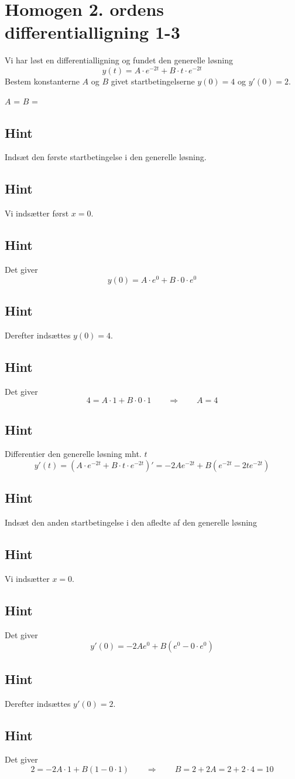 \documentclass{article}
\newenvironment{exercise}[1]{\newpage\section{#1}}{}
\newcommand{\answerbox}[1]{\fbox{$#1$}}
\newcommand{\hint}{\subsection*{Hint}}
\begin{document}
\begin{exercise}{Homogen 2. ordens differentialligning 1-3}
	
Vi har løst en differentialligning og fundet den generelle løsning
\[
y(t) = A \cdot e^{-2t} + B \cdot t \cdot e^{-2t}
\]
Bestem konstanterne $A$ og $B$ givet startbetingelserne $y(0)=4$ og $y'(0)=2$.


$A$ = \answerbox{4}		$B$ = \answerbox{10}

\hint

Indsæt den første startbetingelse i den generelle løsning. 


\hint

Vi indsætter først $x=0$.

\hint

Det giver
\[
y(0)=  A \cdot e^{0} + B \cdot 0 \cdot e^{0}
\]

\hint

Derefter indsættes $y(0)=4$.

\hint 

Det giver 
\[
4 = A \cdot 1 + B \cdot 0 \cdot 1 \qquad \Rightarrow \qquad A = 4
\]

\hint 

Differentier den generelle løsning mht. $t$
\[
y'(t)= \left(A \cdot e^{-2t} + B \cdot t \cdot e^{-2t} \right)' = -2A e^{-2t} + B \left( e^{-2t} -2 t e^{-2t} \right)
\]

\hint 

Indsæt den anden startbetingelse i den afledte af den generelle løsning

\hint

Vi indsætter $x=0$.

\hint 

Det giver
\[
y'(0) = -2A e^{0} + B \left( e^{0} - 0 \cdot e^{0} \right)
\]

\hint 

Derefter indsættes $y'(0)=2$.

\hint

Det giver
\[
2 = -2A \cdot 1 + B \left(1- 0 \cdot 1 \right) \qquad \Rightarrow \qquad B = 2 + 2A = 2 + 2 \cdot 4 = 10
\]

	
\end{exercise}

\newpage
\end{document}
